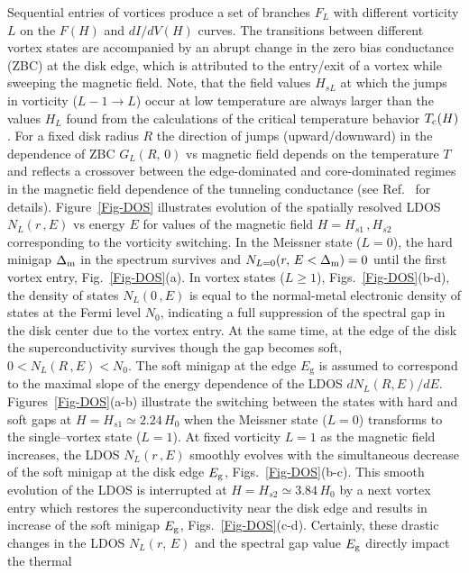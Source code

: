 \documentclass[prx,twocolumn,aps,superscriptaddress,showpacs,amsmath,amssymb,footnoteinbib]{revtex4-1}
\begin{document}
Sequential entries of vortices produce a set of branches $F_L$
with different vorticity $L$ on the $F(H)$ and $dI/dV(H)$ curves.
The transitions between different vortex states are accompanied by
an abrupt change in the zero bias conductance (ZBC) at the disk
edge, which is attributed to the entry/exit of a vortex while
sweeping the magnetic field. Note, that the field values $H_{sL}$
at which the jumps in vorticity ($L-1 \to L$) occur at low
temperature are always larger than the values $H_L$ found from the
calculations of the critical temperature behavior $T_{\rm c}(H)$.
For a fixed disk radius $R$ the direction of jumps
(upward/downward) in the dependence of ZBC $G_L(R,\,0)$ vs
magnetic field depends on the temperature $T$ and reflects a
crossover between the edge-dominated and core-dominated regimes in
the magnetic field dependence of the tunneling conductance (see
Ref.~ for details).
Figure~\ref{Fig-DOS} illustrates evolution of the spatially
resolved LDOS $N_L(r\,,E)$ vs energy $E$ for values of the magnetic
field $H = H_{s1}\,,H_{s2}$ corresponding to the vorticity
switching. In the Meissner state ($L = 0$), the hard minigap
$\Delta_{\rm m}$ in the spectrum survives and $N_{L=0}(r,\,E <
\Delta_{\rm m}) = 0$ until the first vortex entry,
Fig.~\ref{Fig-DOS}(a). In vortex states ($L \ge 1$),
Figs.~\ref{Fig-DOS}(b-d), the density of states $N_L(0\,,E)$ is
equal to the normal-metal electronic density of states at the
Fermi level $N_0$, indicating a full suppression of the spectral
gap in the disk center due to the vortex entry. At the same time,
at the edge of the disk the superconductivity survives though the
gap becomes soft, $0 < N_L(R\,, E) < N_0$. The soft minigap at the
edge $E_\mathrm{g}$ is assumed to correspond to the maximal slope
of the energy dependence of the LDOS $d N_L(R,E) / d E$.
Figures~\ref{Fig-DOS}(a-b) illustrate the switching between the
states with hard and soft gaps at $H = H_{s1} \simeq 2.24\,H_0$
when the Meissner state ($L = 0$) transforms to the single--vortex
state ($L=1$). At fixed vorticity $L=1$ as the magnetic field
increases, the LDOS $N_L(r\,,E)$ smoothly evolves with the
simultaneous decrease of the soft minigap at the disk edge $E_{\rm
g}$, Figs.~\ref{Fig-DOS}(b-c).
%
This smooth evolution of the LDOS is interrupted at $H = H_{s2}
\simeq 3.84\,H_0$ by a next vortex entry which restores the
superconductivity near the disk edge and results in increase of
the soft minigap $E_{\rm g}$, Figs.~\ref{Fig-DOS}(c-d).
Certainly, these drastic changes in the LDOS $N_L(r,\,E)$ and the
spectral gap value $E_{\rm g}$ directly impact the thermal
\end{document}
